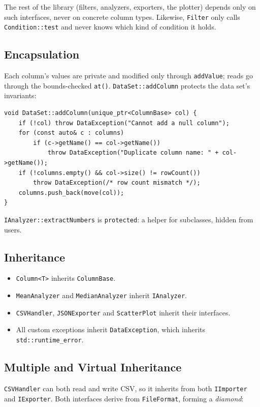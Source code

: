 \documentclass[11pt,a4paper]{article}
\newcommand{\code}[1]{\texttt{#1}}
\begin{document}
The rest of the library (filters, analyzers, exporters, the plotter) depends only on such
interfaces, never on concrete column types. Likewise, \code{Filter} only calls
\code{Condition::test} and never knows which kind of condition it holds.

\subsection{Encapsulation}

Each column's values are private and modified only through \code{addValue}; reads go through the
bounds-checked \code{at()}. \code{DataSet::addColumn} protects the data set's invariants:

\begin{lstlisting}
void DataSet::addColumn(unique_ptr<ColumnBase> col) {
    if (!col) throw DataException("Cannot add a null column");
    for (const auto& c : columns)
        if (c->getName() == col->getName())
            throw DataException("Duplicate column name: " + col->getName());
    if (!columns.empty() && col->size() != rowCount())
        throw DataException(/* row count mismatch */);
    columns.push_back(move(col));
}
\end{lstlisting}

\code{IAnalyzer::extractNumbers} is \code{protected}: a helper for subclasses, hidden from users.

\subsection{Inheritance}

\begin{itemize}[noitemsep]
  \item \code{Column<T>} inherits \code{ColumnBase}.
  \item \code{MeanAnalyzer} and \code{MedianAnalyzer} inherit \code{IAnalyzer}.
  \item \code{CSVHandler}, \code{JSONExporter} and \code{ScatterPlot} inherit their interfaces.
  \item All custom exceptions inherit \code{DataException}, which inherits \code{std::runtime\_error}.
\end{itemize}

\subsection{Multiple and Virtual Inheritance}

\code{CSVHandler} can both read and write CSV, so it inherits from both \code{IImporter} and
\code{IExporter}. Both interfaces derive from \code{FileFormat}, forming a \emph{diamond}:
\end{document}
